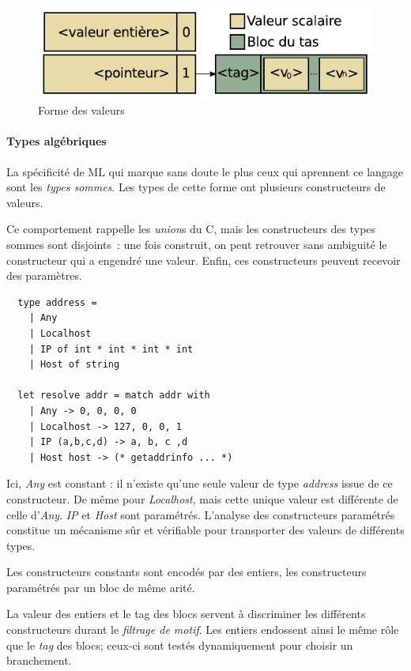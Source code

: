 \begin{figure}
\centering
\includegraphics{media/ocaml_value}
\caption{Forme des valeurs}
\end{figure}

\paragraph{Types algébriques}

La spécificité de ML qui marque sans doute le plus ceux qui aprennent ce langage
sont les \emph{types sommes}. Les types de cette forme ont plusieurs
constructeurs de valeurs.

Ce comportement rappelle les \emph{union}s du C, mais les constructeurs des
types sommes sont disjoints : une fois construit, on peut retrouver sans
ambiguité le constructeur qui a engendré une valeur. Enfin, ces constructeurs
peuvent recevoir des paramètres. 

\begin{lstlisting}
  type address =
    | Any
    | Localhost
    | IP of int * int * int * int
    | Host of string

  let resolve addr = match addr with
    | Any -> 0, 0, 0, 0
    | Localhost -> 127, 0, 0, 1
    | IP (a,b,c,d) -> a, b, c ,d
    | Host host -> (* getaddrinfo ... *)
\end{lstlisting}

Ici, \emph{Any} est constant : il n'existe qu'une seule valeur de type
\emph{address} issue de ce constructeur. De même pour \emph{Localhost}, mais
cette unique valeur est différente de celle d'\emph{Any}. \emph{IP} et
\emph{Host} sont paramétrés.  L'analyse des constructeurs paramétrés constitue
un mécanisme sûr et vérifiable pour transporter des valeurs de différents types.

Les constructeurs constants sont encodés par des entiers, les constructeurs
paramétrés par un bloc de même arité.

La valeur des entiers et le tag des blocs servent à discriminer les différents
constructeurs durant le \emph{filtrage de motif}. Les entiers endossent ainsi
le même rôle que le \emph{tag} des blocs; ceux-ci sont testés dynamiquement
pour choisir un branchement.

